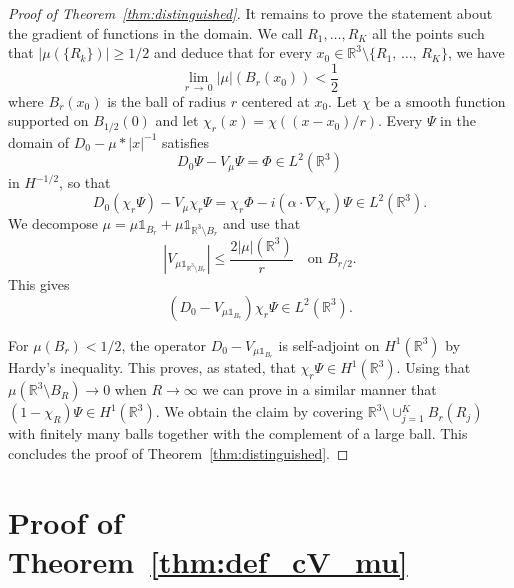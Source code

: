 \documentclass[10pt]{amsart}
\theoremstyle{definition}
\newcommand{\R}{\mathbb{R}}
\newcommand\1{{\ensuremath {\mathds 1} }}
\newcommand{\ii}{\infty}
\renewcommand{\geq}{\geqslant}
\renewcommand{\leq}{\leqslant}
\begin{document}
\begin{proof}[Proof of Theorem~\ref{thm:distinguished}]
It remains to prove the statement about the gradient of functions in the domain. We call $R_1,\dots,R_K$ all the points such that $|\mu(\{R_k\})|\geq1/2$ and deduce that for every $x_0\in\R^3\setminus\{R_1,\,\dots,\,R_K\}$, we have
\[
\lim_{r\,\to\,0}|\mu|(B_r(x_0))<\frac12
\]
where $B_r(x_0)$ is the ball of radius $r$ centered at $x_0$. Let $\chi$ be a smooth function supported on $B_{1/2}(0)$ and let $\chi_r(x)=\chi((x-x_0)/r)$. Every $\Psi$ in the domain of $D_0-\mu\ast|x|^{-1}$ satisfies
\[
D_0\Psi-V_\mu\Psi=\Phi\in L^2\left(\R^3\right)
\]
in $H^{-1/2}$, so that
\[
D_0\left(\chi_r\Psi\right)-V_\mu\chi_r\Psi=\chi_r\Phi-i\left(\alpha\cdot\nabla\chi_r\right)\Psi\in L^2\left(\R^3\right).
\]
We decompose $\mu=\mu\1_{B_r}+\mu\1_{\R^3\setminus B_r}$ and use that
\[
\left|V_{\mu\1_{\R^3\setminus B_r}}\right|\leq \frac{2|\mu|\left(\R^3\right)}{r}\quad\text{on }B_{r/2}.
\]
This gives
\[
\left(D_0-V_{\mu\1_{B_r}}\right)\chi_r\Psi\in L^2\left(\R^3\right).
\]

For $\mu(B_r)<1/2$, the operator $D_0-V_{\mu\1_{B_r}}$ is self-adjoint on $H^1(\R^3)$ by Hardy's inequality. This proves, as stated, that $\chi_r\Psi\in H^1(\R^3)$. Using that $\mu(\R^3\setminus B_R)\to0$ when $R\to\ii$ we can prove in a similar manner that $(1-\chi_R)\Psi\in H^1(\R^3)$. We obtain the claim by covering $\R^3\setminus\cup_{j=1}^KB_r(R_j)$ with finitely many balls together with the complement of a large ball. This concludes the proof of Theorem~\ref{thm:distinguished}.
\end{proof}



\section{Proof of Theorem~\ref{thm:def_cV_mu}}\label{sec:proof_cV_mu}
\end{document}
